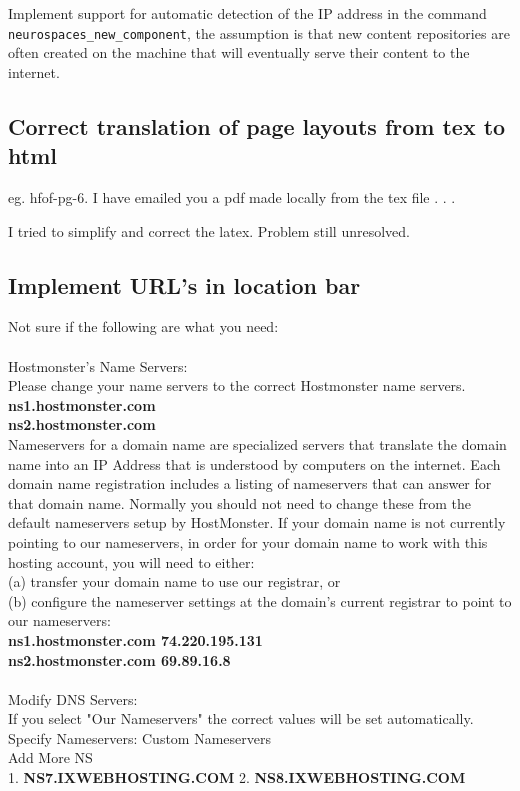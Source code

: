 \documentclass[12pt]{article}
\begin{document}
Implement support for automatic detection of the IP address in the
command {\tt neurospaces\_new\_component}, the assumption is that new
content repositories are often created on the machine that will
eventually serve their content to the internet.


\subsection{Correct translation of page layouts from tex to html}
eg. hfof-pg-6. I have emailed you a pdf made locally from the tex file . . .

I tried to simplify and correct the latex.  Problem still unresolved.


\subsection{Implement URL's in location bar}

Not sure if the following are what you need:\\

\\
Hostmonster's Name Servers:\\
Please change your name servers to the correct Hostmonster name servers.\\
{\bf ns1.hostmonster.com \\
ns2.hostmonster.com} \\

\noindent Nameservers for a domain name are specialized servers that translate the domain name into an IP Address that is understood by computers on the internet. Each domain name registration includes a listing of nameservers that can answer for that domain name. Normally you should not need to change these from the default nameservers setup by HostMonster. If your domain name is not currently pointing to our nameservers, in order for your domain name to work with this hosting account, you will need to either:\\
(a) transfer your domain name to use our registrar, or\\
(b) configure the nameserver settings at the domain's current registrar to point to our nameservers:\\
{\bf ns1.hostmonster.com  74.220.195.131\\
ns2.hostmonster.com  69.89.16.8}\\

\\
Modify DNS Servers:\\
If you select "Our Nameservers" the correct values will be set automatically.\\
Specify Nameservers:	Custom Nameservers\\	
Add More NS\\
1.	{\bf NS7.IXWEBHOSTING.COM}	2.	{\bf NS8.IXWEBHOSTING.COM}
\end{document}
